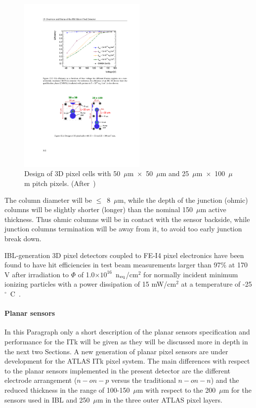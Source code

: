 \begin{figure}[!htpb]
\centering
\includegraphics[width=0.55\textwidth]{3D_design.pdf}
\caption{\label{fig:3D_design} Design of 3D pixel cells with 50~$\mu$m~$\times$~50~$\mu$m  and 25~$\mu$m~$\times$~100~$\mu$m pitch pixels. (After~\cite{ITkStripsTDR})}
\end{figure}

The column diameter will be $\le$~8~$\mu$m, while the depth of the junction (ohmic) columns will be 
slightly shorter (longer) than the nominal  150~$\mu$m active thickness. Thus ohmic columns will 
be in contact with the sensor backside, while junction columns termination will be away from it, to 
avoid too early junction break down.

IBL-generation 3D pixel detectors coupled to FE-I4 pixel electronics have been found to have hit efficiencies 
in test beam measurements larger than 97\% at 170 V after irradiation to $\Phi$ of 
1.0$\times10^{16}$~n$_{\rm eq}$/cm$^2$ for normally incident minimum ionizing particles with a power 
dissipation of 15 mW/cm$^2$ at a temperature of -25$^{\circ}$~C~\cite{1748-0221-11-11-C11024}.

\paragraph{Planar sensors}
In this Paragraph only a short description of the planar sensors specification and performance 
for the ITk will be given as they will be discussed more in depth in the next two Sections. 
A new generation of planar pixel sensors are under development for the ATLAS ITk pixel system. The main 
differences with respect to the planar sensors implemented in the present detector are the different 
electrode arrangement ($n-on-p$ versus the traditional $n-on-n$) and the reduced thickness in the range of 
100-150~$\mu$m with respect to the 200~$\mu$m for the sensors used in IBL and 250~$\mu$m 
in the three outer ATLAS pixel layers. 

